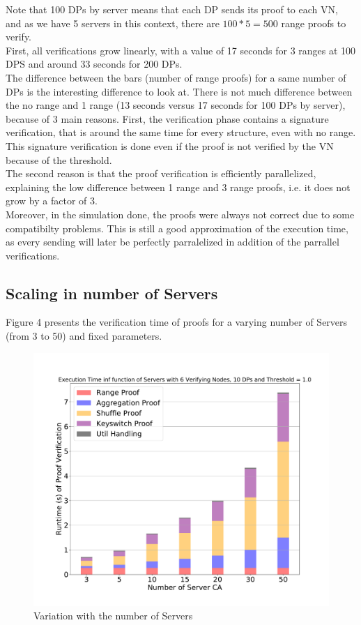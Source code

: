 \documentclass{article}
\begin{document}
Note that 100 DPs by server means that each  DP sends its proof to each VN, and as we have 5 servers in this context, there are $100*5 = 500$ range proofs to verify.\\
First, all verifications grow linearly, with a value of 17 seconds for 3 ranges at 100 DPS and around 33 seconds for 200 DPs.\\
The difference between the bars (number of range proofs) for a same number of DPs is the interesting difference to look at. There is not much difference between the no range and 1 range (13 seconds versus 17 seconds for 100 DPs by server), because of 3 main reasons. First, the verification phase contains a signature verification, that is around the same time for every structure, even with no range. This signature verification is done even if the proof is not verified by the VN because of the threshold.\\
The second reason is that the proof verification is efficiently parallelized, explaining the low difference between 1 range and 3 range proofs, i.e. it does not grow by a factor of 3.\\
Moreover, in the simulation done, the proofs were always not correct due to some compatibilty problems. This is still a good approximation of the execution time, as every sending will later be perfectly parralelized in addition of the 
parrallel verifications.

\subsection{Scaling in number of Servers}
Figure 4 presents the verification time of proofs for a varying number of Servers (from 3 to 50) and fixed parameters.

\begin{figure}[H]
\includegraphics[scale=0.5]{variationInServ}
\caption{Variation with the number of Servers}
\end{figure}
\end{document}
